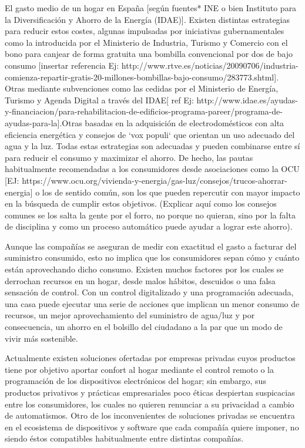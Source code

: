 El gasto medio de un hogar en España [según fuentes* INE o bien Instituto para la Diversificación y Ahorro de la Energía (IDAE)]. Existen distintas estrategias para reducir estos costes, algunas impulsadas por iniciativas gubernamentales como la introducida por el Ministerio de Industria, Turismo y Comercio con el bono para canjear de forma gratuita una bombilla convencional por dos de bajo consumo [insertar referencia Ej: http://www.rtve.es/noticias/20090706/industria-comienza-repartir-gratis-20-millones-bombillas-bajo-consumo/283773.shtml]. Otras mediante subvenciones como las cedidas por el Ministerio de Energía, Turismo y Agenda Digital a través del IDAE[ ref Ej: http://www.idae.es/ayudas-y-financiacion/para-rehabilitacion-de-edificios-programa-pareer/programa-de-ayudas-para-la].Otras basadas en la adquisición de electrodomésticos con alta eficiencia energética y consejos de `vox populi` que orientan un uso adecuado del agua y la luz. Todas estas estrategias son adecuadas y pueden combinarse entre sí para reducir el consumo y maximizar el ahorro. De hecho, las pautas habitualmente recomendadas a los consumidores desde asociaciones como la OCU [EJ: https://www.ocu.org/vivienda-y-energia/gas-luz/consejos/trucos-ahorrar-energia] o los de sentido común, son los que pueden repercutir con mayor impacto en la búsqueda de cumplir estos objetivos. (Explicar aquí como los consejos comunes se los salta la gente por el forro, no porque no quieran, sino por la falta de disciplina y como un proceso automático puede ayudar a lograr este ahorro).

Aunque las compañías se aseguran de medir con exactitud el gasto a facturar del suministro consumido, esto no implica que los consumidores sepan cómo y cuánto están aprovechando dicho consumo. Existen muchos factores por los cuales se derrochan recursos en un hogar, desde malos hábitos, descuidos o una falsa sensación de control. Con un control digitalizado y una programación adecuada, una casa puede ejecutar una serie de acciones que implican un menor consumo de recursos, un mejor aprovechamiento del suministro de agua/luz y por consecuencia, un ahorro en el bolsillo del ciudadano a la par que un modo de vivir más sostenible.

Actualmente existen soluciones ofertadas por empresas privadas cuyos productos tiene por objetivo aportar confort al hogar mediante el control remoto o la programación de los dispositivos electrónicos del hogar; sin embargo, sus productos privativos y prácticas empresariales poco éticas despiertan suspicacias entre los consumidores, los cuales no quieren renunciar a su privacidad a cambio de automatismos. Otro de los inconvenientes de soluciones privadas se encuentra en el ecosistema de dispositivos y software que cada compañía quiere imponer, no siendo éstos compatibles habitualmente entre distintas compañías.


